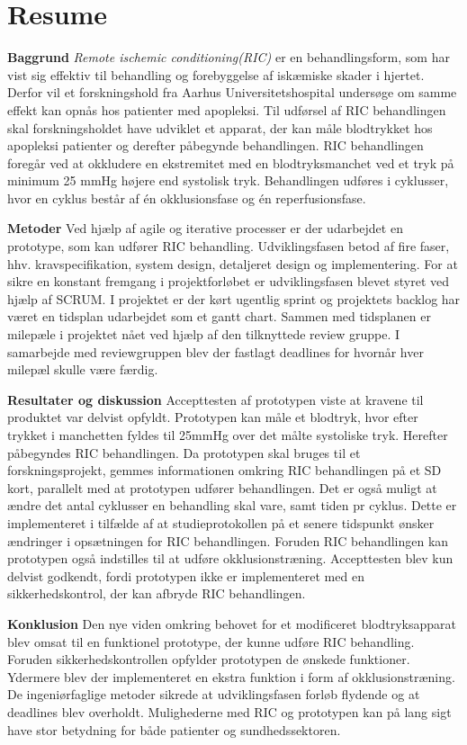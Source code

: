 \chapter*{Resume}
\textbf{Baggrund}
\textit{Remote ischemic conditioning(RIC)} er en behandlingsform, som har vist sig effektiv til behandling og forebyggelse af iskæmiske skader i hjertet. Derfor vil et forskningshold fra Aarhus Universitetshospital undersøge om samme effekt kan opnås hos patienter med apopleksi. Til udførsel af RIC behandlingen skal forskningsholdet have udviklet et apparat, der kan måle blodtrykket hos apopleksi patienter og derefter påbegynde behandlingen. RIC behandlingen foregår ved at okkludere en ekstremitet med en blodtryksmanchet ved et tryk på minimum 25 mmHg højere end systolisk tryk. Behandlingen udføres i cyklusser, hvor en cyklus består af én okklusionsfase og én reperfusionsfase. 

\textbf{Metoder}
Ved hjælp af agile og iterative processer er der udarbejdet en prototype, som kan udfører RIC behandling. Udviklingsfasen betod af fire faser, hhv. kravspecifikation, system design, detaljeret design og implementering. For at sikre en konstant fremgang i projektforløbet er udviklingsfasen blevet styret ved hjælp af SCRUM. I projektet er der kørt ugentlig sprint og projektets backlog har været en tidsplan udarbejdet som et gantt chart. Sammen med tidsplanen er milepæle i projektet nået ved hjælp af den tilknyttede review gruppe. I samarbejde med reviewgruppen blev der fastlagt deadlines for hvornår hver milepæl skulle være færdig.

\textbf{Resultater og diskussion}
Accepttesten af prototypen viste at kravene til produktet var delvist opfyldt. Prototypen kan måle et blodtryk, hvor efter trykket i manchetten fyldes til 25mmHg over det målte systoliske tryk. Herefter påbegyndes RIC behandlingen. Da prototypen skal bruges til et forskningsprojekt, gemmes informationen omkring RIC behandlingen på et SD kort, parallelt med at prototypen udfører behandlingen. Det er også muligt at ændre det antal cyklusser en behandling skal vare, samt tiden pr cyklus. Dette er implementeret i tilfælde af at studieprotokollen på et senere tidspunkt ønsker ændringer i opsætningen for RIC behandlingen. Foruden RIC behandlingen kan prototypen også indstilles til at udføre okklusionstræning. Accepttesten blev kun  delvist godkendt, fordi prototypen ikke er implementeret med en sikkerhedskontrol, der kan afbryde RIC behandlingen. 

\textbf{Konklusion}
 Den nye viden omkring behovet for et modificeret blodtryksapparat blev omsat til en funktionel prototype, der kunne udføre RIC behandling. Foruden sikkerhedskontrollen opfylder prototypen de ønskede funktioner. Ydermere blev der implementeret en ekstra funktion i form af okklusionstræning. De ingeniørfaglige metoder sikrede at udviklingsfasen forløb flydende og at deadlines blev overholdt. Mulighederne med RIC og prototypen kan på lang sigt have stor betydning for både patienter og sundhedssektoren.
